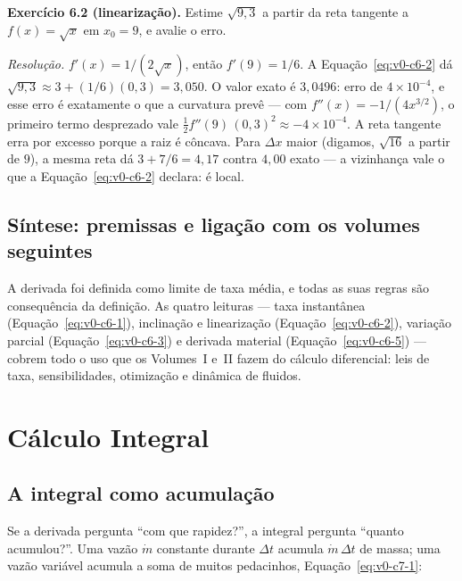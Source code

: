 \documentclass[12pt,a4paper]{article}
\numberwithin{equation}{section}
\numberwithin{table}{section}
\numberwithin{figure}{section}
\begin{document}
\textbf{Exercício 6.2 (linearização).} Estime $\sqrt{9{,}3}$ a partir da
reta tangente a $f(x) = \sqrt{x}$ em $x_0 = 9$, e avalie o erro.

\emph{Resolução.} $f'(x) = 1/(2\sqrt{x})$, então $f'(9) = 1/6$. A
Equação~\eqref{eq:v0-c6-2} dá $\sqrt{9{,}3} \approx 3 + (1/6)(0{,}3) =
3{,}050$. O valor exato é $3{,}0496$: erro de $4\times 10^{-4}$, e esse
erro é exatamente o que a curvatura prevê --- com
$f''(x) = -1/(4x^{3/2})$, o primeiro termo desprezado vale
$\tfrac{1}{2}f''(9)\,(0{,}3)^2 \approx -4\times 10^{-4}$. A reta tangente
erra por excesso porque a raiz é côncava. Para $\Delta x$
maior (digamos, $\sqrt{16}$ a partir de $9$), a mesma reta dá
$3 + 7/6 = 4{,}17$ contra $4{,}00$ exato --- a vizinhança vale o que a
Equação~\eqref{eq:v0-c6-2} declara: é local.

\subsection{Síntese: premissas e ligação com os volumes seguintes}

A derivada foi definida como limite de taxa média, e todas as suas regras
são consequência da definição. As quatro leituras --- taxa instantânea
(Equação~\eqref{eq:v0-c6-1}), inclinação e linearização
(Equação~\eqref{eq:v0-c6-2}), variação parcial
(Equação~\eqref{eq:v0-c6-3}) e derivada material
(Equação~\eqref{eq:v0-c6-5}) --- cobrem todo o uso que os Volumes~I e~II
fazem do cálculo diferencial: leis de taxa, sensibilidades, otimização e
dinâmica de fluidos.


\clearpage
\section{Cálculo Integral}\label{sec:v0-integrais}

\subsection{A integral como acumulação}

Se a derivada pergunta ``com que rapidez?'', a integral pergunta ``quanto
acumulou?''. Uma vazão $\dot{m}$ constante durante $\Delta t$ acumula
$\dot{m}\,\Delta t$ de massa; uma vazão variável acumula a soma de muitos
pedacinhos, Equação~\eqref{eq:v0-c7-1}:
\end{document}

